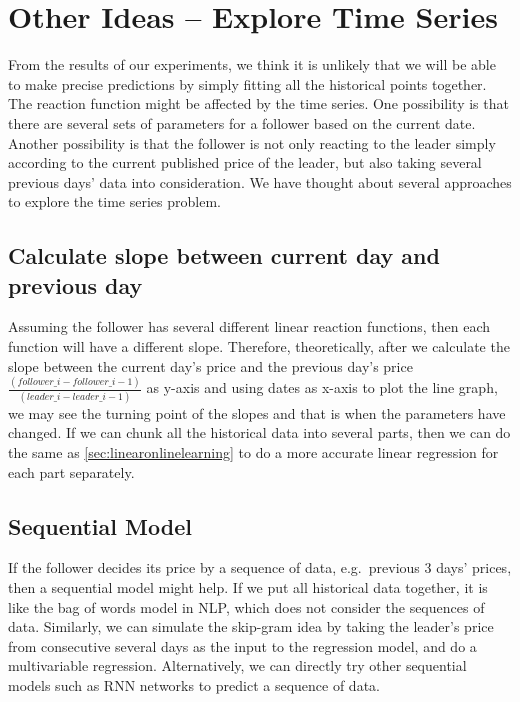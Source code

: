 \documentclass[a4paper]{article}
\begin{document}
\section{Other Ideas -- Explore Time Series}
From the results of our experiments, we think it is unlikely that we will be
able to make precise predictions by simply fitting all the historical points
together.
The reaction function might be affected by the time series.
One possibility is that there are several sets of parameters for a follower
based on the current date.
Another possibility is that the follower is not only reacting to the leader 
simply according to the current published price of the leader, but also taking
several previous days' data into consideration.
We have thought about several approaches to explore the time series problem.

\subsection{Calculate slope between current day and previous day}
Assuming the follower has several different linear reaction functions, then each
function will have a different slope.
Therefore, theoretically, after we calculate the slope between the current day's
price and the previous day's price
$\frac{(follower\_i - follower\_i-1)}{(leader\_i - leader\_i-1)}$ as y-axis and
using dates as x-axis to plot the line graph, we may see the turning point of
the slopes and that is when the parameters have changed.
If we can chunk all the historical data into several parts, then we can do the
same as \cref{sec:linearonlinelearning} to do a more accurate linear regression
for each part separately.

\subsection{Sequential Model}
If the follower decides its price by a sequence of data, e.g.\ previous 3 days'
prices, then a sequential model might help.
If we put all historical data together, it is like the bag of words model in
NLP, which does not consider the sequences of data.
Similarly, we can simulate the skip-gram idea by taking the leader's price from
consecutive several days as the input to the regression model, and do a
multivariable regression.
Alternatively, we can directly try other sequential models such as RNN networks
to predict a sequence of data.
\end{document}

